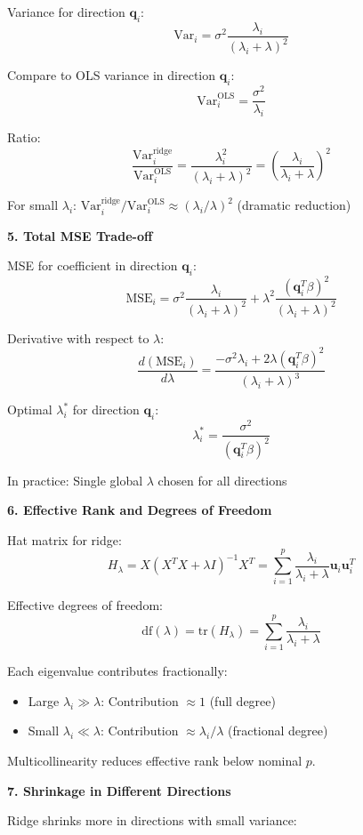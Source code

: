 \documentclass[12pt]{article}
\begin{document}
\begin{explanation}
Variance for direction $\mathbf{q}_i$:
\[\text{Var}_i = \sigma^2 \frac{\lambda_i}{(\lambda_i + \lambda)^2}\]

Compare to OLS variance in direction $\mathbf{q}_i$:
\[\text{Var}_i^{\text{OLS}} = \frac{\sigma^2}{\lambda_i}\]

Ratio:
\[\frac{\text{Var}_i^{\text{ridge}}}{\text{Var}_i^{\text{OLS}}} = \frac{\lambda_i^2}{(\lambda_i + \lambda)^2} = \left(\frac{\lambda_i}{\lambda_i + \lambda}\right)^2\]

For small $\lambda_i$: $\text{Var}_i^{\text{ridge}}/\text{Var}_i^{\text{OLS}} \approx (\lambda_i/\lambda)^2$ (dramatic reduction)

\textbf{5. Total MSE Trade-off}

MSE for coefficient in direction $\mathbf{q}_i$:
\[\text{MSE}_i = \sigma^2 \frac{\lambda_i}{(\lambda_i + \lambda)^2} + \lambda^2 \frac{(\mathbf{q}_i^T\beta)^2}{(\lambda_i + \lambda)^2}\]

Derivative with respect to $\lambda$:
\[\frac{d(\text{MSE}_i)}{d\lambda} = \frac{-\sigma^2\lambda_i + 2\lambda(\mathbf{q}_i^T\beta)^2}{(\lambda_i + \lambda)^3}\]

Optimal $\lambda_i^*$ for direction $\mathbf{q}_i$:
\[\lambda_i^* = \frac{\sigma^2}{(\mathbf{q}_i^T\beta)^2}\]

In practice: Single global $\lambda$ chosen for all directions

\textbf{6. Effective Rank and Degrees of Freedom}

Hat matrix for ridge:
\[H_{\lambda} = X(X^TX + \lambda I)^{-1}X^T = \sum_{i=1}^{p} \frac{\lambda_i}{\lambda_i + \lambda} \mathbf{u}_i\mathbf{u}_i^T\]

Effective degrees of freedom:
\[\text{df}(\lambda) = \text{tr}(H_{\lambda}) = \sum_{i=1}^{p} \frac{\lambda_i}{\lambda_i + \lambda}\]

Each eigenvalue contributes fractionally:
\begin{itemize}
\item Large $\lambda_i \gg \lambda$: Contribution $\approx 1$ (full degree)
\item Small $\lambda_i \ll \lambda$: Contribution $\approx \lambda_i/\lambda$ (fractional degree)
\end{itemize}

Multicollinearity reduces effective rank below nominal $p$.

\textbf{7. Shrinkage in Different Directions}

Ridge shrinks more in directions with small variance:


\end{explanation}
\end{document}
